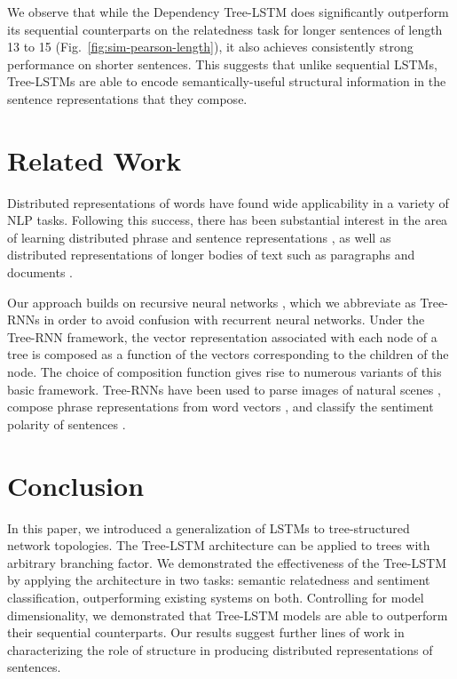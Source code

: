 \documentclass[11pt]{article}
\begin{document}
We observe that while the Dependency Tree-LSTM does significantly outperform its sequential counterparts on the relatedness task for longer sentences of length 13 to 15 (Fig.~\ref{fig:sim-pearson-length}), it also achieves consistently strong performance on shorter sentences. This suggests that unlike sequential LSTMs, Tree-LSTMs are able to encode semantically-useful structural information in the sentence representations that they compose.

\section{Related Work}

Distributed representations of words  \citep{rumelhart1988learning,collobert2011natural,turian2010word,HuangEtAl2012,mikolov2013distributed,pennington2014glove} have found wide applicability in a variety of NLP tasks. Following this success, there has been substantial interest in the area of learning distributed phrase and sentence representations \citep{mitchell2010composition,yessenalina2011compositional,grefenstette2013multi,mikolov2013distributed}, as well as distributed representations of longer bodies of text such as paragraphs and documents \citep{srivastava2013modeling,le2014distributed}.

Our approach builds on recursive neural networks \citep{goller1996learning,socher2011parsing}, which we abbreviate as Tree-RNNs in order to avoid confusion with recurrent neural networks. Under the Tree-RNN framework, the vector representation associated with each node of a tree is composed as a function of the vectors corresponding to the children of the node. The choice of composition function gives rise to numerous variants of this basic framework. Tree-RNNs have been used to parse images of natural scenes \citep{socher2011parsing}, compose phrase representations from word vectors \citep{socher2012semantic}, and classify the sentiment polarity of sentences \citep{socher2013recursive}. 

\section{Conclusion}

In this paper, we introduced a generalization of LSTMs to tree-structured network topologies. The Tree-LSTM architecture can be applied to trees with arbitrary branching factor. We demonstrated the effectiveness of the Tree-LSTM by applying the architecture in two tasks: semantic relatedness and sentiment classification, outperforming existing systems on both. Controlling for model dimensionality, we demonstrated that Tree-LSTM models are able to outperform their sequential counterparts. Our results suggest further lines of work in characterizing the role of structure in producing distributed representations of sentences. 
\end{document}
